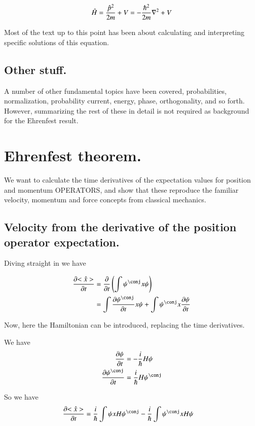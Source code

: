 \begin{align*}
\hat{H} = \frac{\hat{p}^2}{2m} + V = -\frac{\hbar^2}{2m} \nabla^2 + V
\end{align*}

Most of the text up to this point has been about calculating and interpreting
specific solutions of this equation.

\subsection{Other stuff. }

A number of other fundamental topics have been covered, probabilities, normalization, probability current, energy, phase, orthogonality, and so forth.  However, summarizing the rest of these in detail is not required as 
background for the Ehrenfest result.

\section{Ehrenfest theorem. }

We want to calculate the time derivatives of the expectation values
for position and momentum OPERATORS, and show that these reproduce the
familiar velocity, momentum and force concepts from classical mechanics.

\subsection{Velocity from the derivative of the position operator expectation. }

Diving straight in we have

\begin{align*}
\PD{t}{<\hat{x}>}
&= \PD{t}{} \left( \int \psi^\conj x \psi \right) \\
&= \int \PD{t}{\psi^\conj} x \psi + \int \psi^\conj x \PD{t}{\psi} 
\end{align*}

Now, here the Hamiltonian can be introduced, replacing the time derivatives.

We have
\begin{align*}
\PD{t}{\psi} &= -\frac{i}{\hbar} H \psi \\
\PD{t}{\psi^\conj} &= \frac{i}{\hbar} H \psi^\conj \\
\end{align*}

So we have
\begin{align*}
\PD{t}{<\hat{x}>}
&= \frac{i}{\hbar} \int \psi x H {\psi^\conj} - \frac{i}{\hbar}\int \psi^\conj x H {\psi} 
\end{align*}

